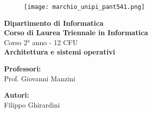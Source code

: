 \begin{titlepage} %
\begin{figure}[t] %
    \centering\texttt{[image: marchio\_unipi\_pant541.png]}
\end{figure}
\vspace{20mm}

\begin{Large}
 \begin{center}
	\textbf{Dipartimento di Informatica\\ Corso di Laurea Triennale in Informatica\\}
	\vspace{20mm}
    {\LARGE{Corso 2° anno - 12 CFU}}\\
	\vspace{10mm}
	{\huge{\bf Architettura e sistemi operativi}}\\
\end{center}
\end{Large}


\vspace{36mm}
\begin{minipage}[t]{0.47\textwidth}
	{\large{\bf Professori:}\\ \large{Prof. Giovanni Manzini}}
\end{minipage}
\hfill
\begin{minipage}[t]{0.47\textwidth}\raggedleft
	{\large{\bf Autori:}\\ \large{Filippo Ghirardini}}
\end{minipage}

\vspace{25mm}

\hrulefill

\vspace{5mm}


\end{titlepage}
